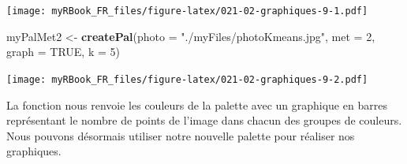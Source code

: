 \documentclass[]{book}
\newenvironment{Shaded}{\begin{snugshade}}{\end{snugshade}}
\newcommand{\DataTypeTok}[1]{\textcolor[rgb]{0.13,0.29,0.53}{#1}}
\newcommand{\DecValTok}[1]{\textcolor[rgb]{0.00,0.00,0.81}{#1}}
\newcommand{\KeywordTok}[1]{\textcolor[rgb]{0.13,0.29,0.53}{\textbf{#1}}}
\newcommand{\NormalTok}[1]{#1}
\newcommand{\OtherTok}[1]{\textcolor[rgb]{0.56,0.35,0.01}{#1}}
\newcommand{\StringTok}[1]{\textcolor[rgb]{0.31,0.60,0.02}{#1}}
\begin{document}
\texttt{[image: myRBook\_FR\_files/figure-latex/021-02-graphiques-9-1.pdf]}

\begin{Shaded}
\begin{Highlighting}[]
\NormalTok{myPalMet2 <-}\StringTok{ }\KeywordTok{createPal}\NormalTok{(}\DataTypeTok{photo =} \StringTok{"./myFiles/photoKmeans.jpg"}\NormalTok{, }
  \DataTypeTok{met =} \DecValTok{2}\NormalTok{, }\DataTypeTok{graph =} \OtherTok{TRUE}\NormalTok{, }\DataTypeTok{k =} \DecValTok{5}\NormalTok{)}
\end{Highlighting}
\end{Shaded}

\texttt{[image: myRBook\_FR\_files/figure-latex/021-02-graphiques-9-2.pdf]}

La fonction nous renvoie les couleurs de la palette avec un graphique en barres représentant le nombre de points de l'image dans chacun des groupes de couleurs. Nous pouvons désormais utiliser notre nouvelle palette pour réaliser nos graphiques.
\end{document}
